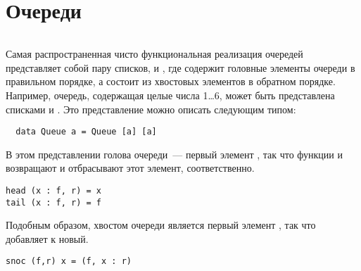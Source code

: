 \documentclass[aspectratio=169
  , xcolor={svgnames}
  , hyperref={ colorlinks,citecolor=DeepPink4
             , linkcolor=DarkRed,urlcolor=DarkBlue}
  , russian
  ]{beamer}
\theoremstyle{exerciseStyle1}
\begin{document}
\section{Очереди}
\label{sc:5.2}


\begin{frame}[fragile]{}

\begin{minipage}{.4\textwidth}
  \inputminted[firstline=5,lastline=11] {haskell}{code/Queue.lhs}
\end{minipage}
\begin{minipage}{.55\textwidth}
  Самая распространенная чисто функциональная реализация очередей
  представляет собой пару списков,  и , где
   содержит головные элементы очереди в правильном порядке,
  а  состоит из хвостовых элементов в обратном порядке.\\
  
  Например, очередь, содержащая целые числа 1\ldots 6, может быть
  представлена списками  и
  . Это представление можно описать следующим
  типом:
  \begin{verbatim}
  data Queue a = Queue [a] [a]
  \end{verbatim}
  
\end{minipage}
\end{frame}


\begin{frame}[fragile]{}
В этом представлении голова очереди~--- первый элемент ,
так что функции  и 
возвращают и отбрасывают этот элемент, соответственно.
\begin{verbatim}
head (x : f, r) = x
tail (x : f, r) = f
\end{verbatim}
Подобным образом, хвостом очереди является первый элемент
, так что  добавляет к 
новый.
\begin{verbatim}
snoc (f,r) x = (f, x : r)
\end{verbatim}

\end{frame}
\end{document}
